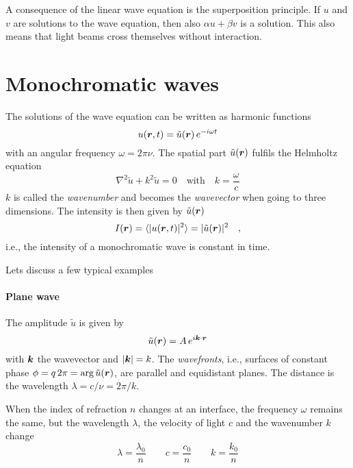 A consequence of the linear wave equation is the superposition principle. If $u$ and $v$ are solutions to the wave equation, then also $\alpha u + \beta v$ is a solution. This also means that light beams cross themselves without interaction.


\section{Monochromatic waves}

The solutions of the wave equation can be written as harmonic functions
\begin{equation}
    u(\boldsymbol{r}, t)  = \tilde{u}(\boldsymbol{r}) \, e^{- i \omega t}
\end{equation}
with an angular frequency $\omega = 2 \pi \nu$. The spatial part $\tilde{u}(\boldsymbol{r})$ fulfils the Helmholtz equation
\begin{equation}
    \nabla^2 \tilde{u} + k^2 \tilde{u} = 0 \quad \text{with} \quad k = \frac{\omega}{c}
\end{equation}
$k$ is called the \emph{wavenumber} and becomes the \emph{wavevector} when going to three dimensions. The intensity is then given by $\tilde{u}(\boldsymbol{r})$
\begin{equation}
    I(\boldsymbol{r}) = \braket{ |u(\boldsymbol{r}, t) |^2 } = |\tilde{u}(\boldsymbol{r}) |^2 \quad , 
\end{equation}
i.e., the intensity of a monochromatic wave is constant in time. 

Lets discuss a few typical examples

\paragraph*{Plane wave} The amplitude $\tilde{u}$ is given by
\begin{equation}
 \tilde{u}(\boldsymbol{r}) = A \, e^{i \boldsymbol{k} \cdot \boldsymbol{r}}
\end{equation}
with $\boldsymbol{k}$ the wavevector and $|\boldsymbol{k}| = k $. The \emph{wavefronts}, i.e., surfaces of constant phase $\phi = q \, 2 \pi =  \arg \tilde{u}(\boldsymbol{r})$, are parallel and equidistant planes. The distance is the wavelength $\lambda = c / \nu = 2 \pi / k$.

When the index of refraction $n$ changes at an interface, the frequency $\omega$ remains the same, but the wavelength $\lambda$, the velocity of light $c$ and the wavenumber $k$ change
\begin{equation}
\lambda = \frac{\lambda_0}{n} \qquad
c = \frac{c_0}{n} \qquad
k = \frac{k_0}{n}
\end{equation}
 

